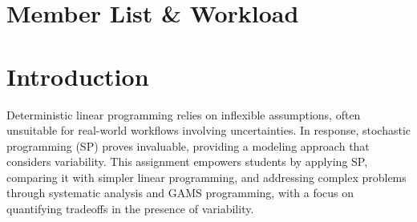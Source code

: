 \documentclass[a4paper]{article}
\begin{document}
	
	\newpage
	\section*{Member List \& Workload}
	\begin{table}[h!]
		\centering
		\label{table:1.5}
	\end{table}
	
	
	\newpage
	\tableofcontents
	\newpage
	
	\section{Introduction}\label{chuan_bi}
	
	\hspace{1.3em} Deterministic linear programming relies on inflexible assumptions, often unsuitable for real-world workflows involving uncertainties. In response, stochastic programming (SP) proves invaluable, providing a modeling approach that considers variability. This assignment empowers students by applying SP, comparing it with simpler linear programming, and addressing complex problems through systematic analysis and GAMS programming, with a focus on quantifying tradeoffs in the presence of variability.\\
	
\end{document}
